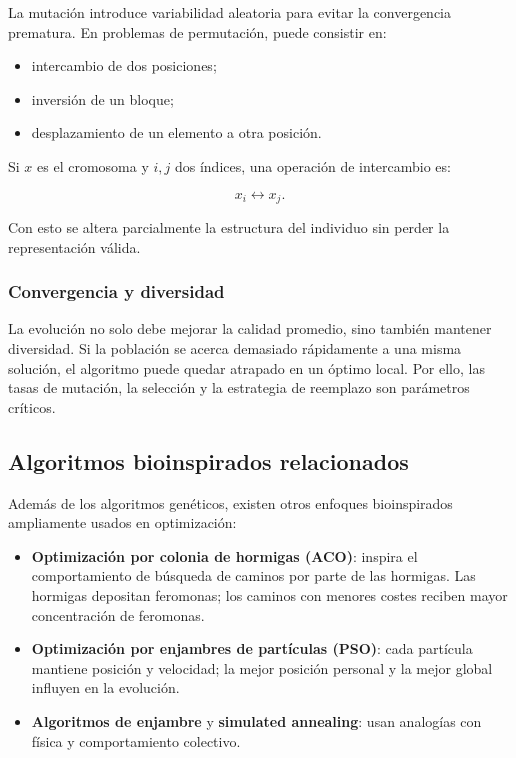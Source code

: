 \documentclass[11pt,a4paper]{article}
\begin{document}
La mutación introduce variabilidad aleatoria para evitar la convergencia prematura. En problemas de permutación, puede consistir en:

\begin{itemize}
    \item intercambio de dos posiciones;
    \item inversión de un bloque;
    \item desplazamiento de un elemento a otra posición.
\end{itemize}

Si $x$ es el cromosoma y $i,j$ dos índices, una operación de intercambio es:

$$
x_i \leftrightarrow x_j.
$$

Con esto se altera parcialmente la estructura del individuo sin perder la representación válida.

\subsubsection{Convergencia y diversidad}

La evolución no solo debe mejorar la calidad promedio, sino también mantener diversidad. Si la población se acerca demasiado rápidamente a una misma solución, el algoritmo puede quedar atrapado en un óptimo local. Por ello, las tasas de mutación, la selección y la estrategia de reemplazo son parámetros críticos.

\subsection{Algoritmos bioinspirados relacionados}

Además de los algoritmos genéticos, existen otros enfoques bioinspirados ampliamente usados en optimización:

\begin{itemize}
    \item \textbf{Optimización por colonia de hormigas (ACO)}: inspira el comportamiento de búsqueda de caminos por parte de las hormigas. Las hormigas depositan feromonas; los caminos con menores costes reciben mayor concentración de feromonas.
    \item \textbf{Optimización por enjambres de partículas (PSO)}: cada partícula mantiene posición y velocidad; la mejor posición personal y la mejor global influyen en la evolución.
    \item \textbf{Algoritmos de enjambre} y \textbf{simulated annealing}: usan analogías con física y comportamiento colectivo.
\end{itemize}
\end{document}
